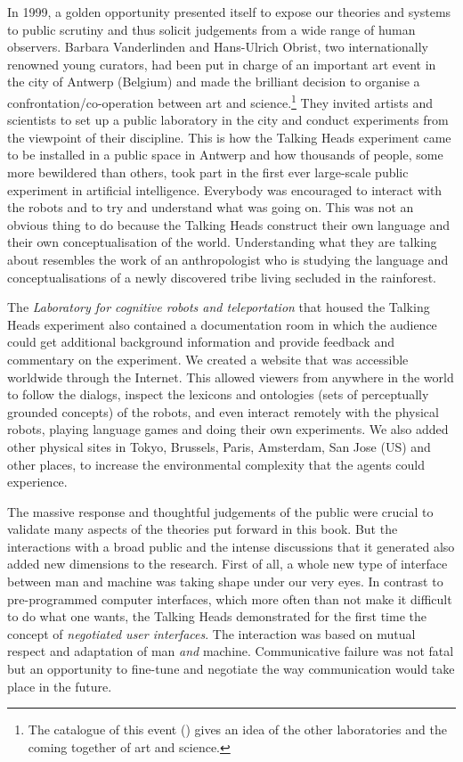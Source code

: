In 1999, a golden opportunity presented itself to 
expose our theories and systems to public scrutiny and thus solicit
judgements from a wide range of human observers. Barbara
Vanderlinden and Hans-Ulrich Obrist, two internationally 
renowned young curators, had been put in charge of 
an important art event in the city of Antwerp (Belgium)
and made the brilliant decision to organise a 
confrontation/co-operation between art and 
science.\footnote{The catalogue of this event (\citealt{Obrist:1999}) gives an idea of 
the other laboratories and the coming together of art and science.}
They invited 
artists and scientists to set up 
a public laboratory in the city and conduct experiments 
from the viewpoint of their discipline. This is how 
the Talking Heads experiment came to be installed in 
a public space in Antwerp and how thousands of people, 
some more bewildered than others, took part in the first
ever large-scale public experiment in artificial intelligence. 
Everybody was encouraged to interact with the robots and 
to try and understand what was going on. This was not an obvious
thing to do because the Talking Heads
construct their own language and their own conceptualisation of 
the world. Understanding what they are talking about resembles the work 
of an anthropologist who is studying the language and
conceptualisations of a newly discovered tribe living
secluded in the rainforest. 

The {\itshape Laboratory for cognitive robots and 
teleportation} that housed the 
Talking Heads experiment also contained  
a documentation room in which the audience could 
get additional background information and 
provide feedback and commentary 
on the experiment. We created a website that was accessible 
worldwide through the Internet. This allowed viewers from anywhere
in the world to follow the dialogs, inspect the lexicons
and ontologies (sets of perceptually grounded concepts) 
of the robots, and even interact remotely with the 
physical robots, playing language games 
and doing their own experiments. We also added
other physical sites in Tokyo, Brussels, Paris, Amsterdam, 
San Jose (US) and other places, to increase the environmental complexity that 
the agents could experience. 

\enlargethispage{1\baselineskip}
The massive response and thoughtful judgements of the 
public were crucial to validate many aspects of the 
theories put forward in this book. 
But the interactions with a broad public and
the intense discussions that it generated also added new
dimensions to the research. First of all, a whole 
new type of interface between man and machine was
taking shape under our very eyes. In contrast to pre-programmed
computer interfaces, which more often than not make it
difficult to do what one wants, the Talking Heads demonstrated
for the first time the concept of {\itshape negotiated user
interfaces}. The interaction was based on mutual respect
and adaptation of man {\itshape and} machine. Communicative
failure was not fatal but 
an opportunity to fine-tune and negotiate the way communication
would take place in the future. 


